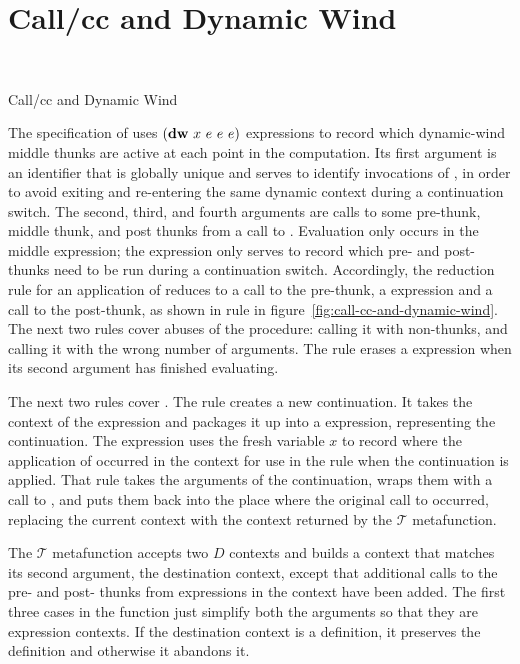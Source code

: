 \section{Call/cc and Dynamic Wind}

\beginfig
\begin{center}
 \\

\end{center}
\caption{Call/cc and Dynamic Wind}\label{fig:call-cc-and-dynamic-wind}
\endfig

The specification of  uses $(\textnormal{\textbf{dw}}~x~e~e~e)$
expressions to record which dynamic-wind middle thunks are active at
each point in the computation. Its first argument is an identifier
that is globally unique and serves to identify invocations of
, in order to avoid exiting and re-entering the
same dynamic context during a continuation switch. The second, third,
and fourth arguments are calls to some pre-thunk, middle thunk, and
post thunks from a call to . Evaluation only
occurs in the middle expression; the  expression only
serves to record which pre- and post- thunks need to be run during a
continuation switch. Accordingly, the reduction rule for an
application of  reduces to a call to the
pre-thunk, a  expression and a call to the post-thunk, as
shown in rule  in
figure~\ref{fig:call-cc-and-dynamic-wind}. The next two rules cover
abuses of the  procedure: calling it with
non-thunks, and calling it with the wrong number of arguments. The
 rule erases a  expression when its second
argument has finished evaluating.

The next two rules cover . The rule
 creates a new continuation. It takes the context
of the  expression and packages it up into a
 expression, representing the continuation. The
 expression uses the fresh variable $x$ to record
where the application of  occurred in the context for
use in the  rule when the continuation is applied.
That rule takes the arguments of the continuation, wraps them with a
call to , and puts them back into the place where the
original call to  occurred, replacing the current
context with the context returned by the $\mathcal{T}$ metafunction.

The $\mathcal{T}$ metafunction accepts two $D$ contexts and
builds a context that matches its second argument, the destination
context, except that additional calls to the pre- and post- thunks
from  expressions in the context have been added. The first
three cases in the function just simplify both the arguments so that
they are expression contexts. If the destination context is a
definition, it preserves the definition and otherwise it abandons it.

